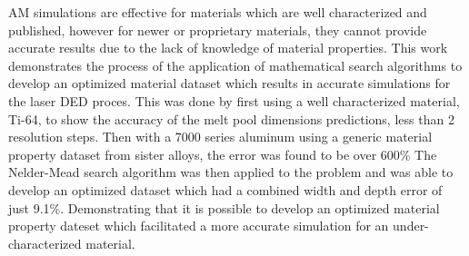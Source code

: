 \label{abstract}

\Acf{AM} simulations 
are effective for materials which are well characterized and published, however for newer or proprietary materials, they cannot provide accurate results due to the lack of knowledge of material properties.  
This work demonstrates the process of the application of mathematical search algorithms to develop an optimized material dataset which results in accurate simulations for the laser \ac{DED} proces.  
This was done  by first using a well characterized material, Ti-64, to show the accuracy of the melt pool dimensions predictions, less than 2 resolution steps.  Then with a 7000 series aluminum using a generic material property dataset from sister alloys, the error was found to be over 600\%
The Nelder-Mead search algorithm was then applied to the problem and was able to develop an optimized dataset which had a combined width and depth error of just 9.1\%.  
Demonstrating that it is possible to develop an optimized material property dateset which facilitated a more accurate simulation for an under-characterized material.